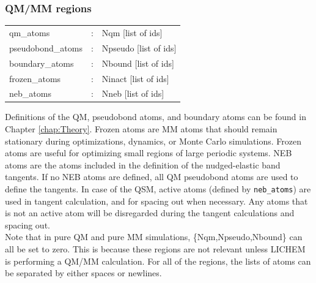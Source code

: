\documentclass[12pt]{report}
\begin{document}
\subsubsection{QM/MM regions}
\begin{center}
\begin{longtable}{ p{4cm} c p{12.5cm}}
qm\_atoms & : & Nqm [list of ids] \newline\\

pseudobond\_atoms & : & Npseudo [list of ids] \newline\\

boundary\_atoms & : & Nbound [list of ids] \newline\\

frozen\_atoms& : & Ninact [list of ids] \newline \\

neb\_atoms & : & Nneb [list of ids]
\end{longtable}
\end{center}
\vspace{-12pt}
Definitions of the QM, pseudobond atoms, and boundary atoms can be found in
Chapter \ref{chap:Theory}.
Frozen atoms are MM atoms that should remain stationary during optimizations,
dynamics, or Monte Carlo simulations.
Frozen atoms are useful for optimizing small regions of large periodic
systems.
NEB atoms are the atoms included in the definition of the nudged-elastic band
tangents.
If no NEB atoms are defined, all QM pseudobond atoms are used to define the
tangents.
In case of the QSM, active atoms (defined by \texttt{neb\_atoms})
 are used in tangent
calculation, and for spacing out when necessary.
Any atoms that is not an active atom will be disregarded during the
tangent calculations and spacing out.\\

Note that in pure QM and pure MM simulations, \{Nqm,Npseudo,Nbound\} can all
be set to zero.
This is because these regions are not relevant unless LICHEM is performing a
QM/MM calculation.
For all of the regions, the lists of atoms can be separated by either spaces
or newlines.\newpage
\end{document}
